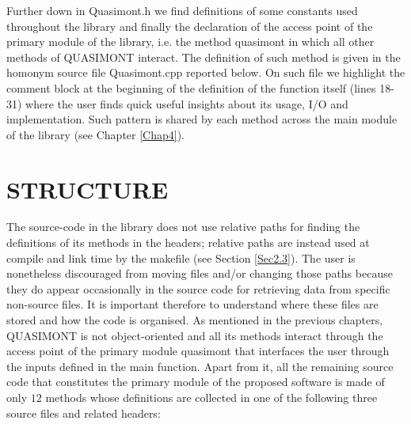 \documentclass[a4paper, twosided]{book}
\begin{document}
\noindent
Further down in \colorbox{poliGrayBlue}{Quasimont.h} we find definitions of some constants used throughout the library and finally the declaration of the access point of the primary module of the library, i.e. the method \colorbox{poliGrayBlue}{quasimont} in which all other methods of QUASIMONT interact. The definition of such method is given in the homonym source file \colorbox{poliGrayBlue}{Quasimont.cpp} reported below. On such file we highlight the comment block at the beginning of the definition of the function itself (lines \colorbox{poliGrayBlue}{18-31}) where the user finds quick useful insights about its usage, I/O and implementation. Such pattern is shared by each method across the main module of the library (see Chapter \ref{Chap4}).

\newpage
{}

\section[Structure]{\changefont STRUCTURE}\label{Sec2.2}

\noindent
The source-code in the library does not use relative paths for finding the definitions of its methods in the headers; relative paths are instead used at compile and link time by the \colorbox{poliGrayBlue}{makefile} (see Section \ref{Sec2.3}). The user is nonetheless discouraged from moving files and/or changing those paths because they do appear occasionally in the source code for retrieving data from specific non-source files. It is important therefore to understand where these files are stored and how the code is organised. As mentioned in the previous chapters, QUASIMONT is not object-oriented and all its methods interact through the access point of the primary module \colorbox{poliGrayBlue}{quasimont} that interfaces the user through the inputs defined in the \colorbox{poliGrayBlue}{main} function. Apart from it, all the remaining source code that constitutes the primary module of the proposed software is made of only $12$ methods whose definitions are collected in one of the following three source files and related headers:
\end{document}
